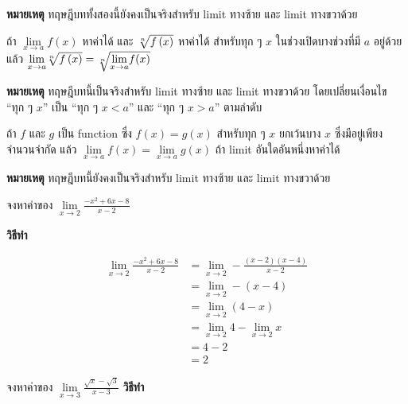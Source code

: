 \documentclass[
]{book}
\begin{document}
\textbf{หมายเหตุ} ทฤษฎีบททั้งสองนี้ยังคงเป็นจริงสำหรับ limit ทางซ้าย และ limit
ทางขวาด้วย

\label{thm-limit-3}
ถ้า \(\underset{x\rightarrow a}{\lim}f(x)\) หาค่าได้ และ
\(\root{n}\of{f\left( x\right) }\) หาค่าได้ สำหรับทุก ๆ \(x\)
ในช่วงเปิดบางช่วงที่มี \(a\) อยู่ด้วย แล้ว
\(\underset{x\rightarrow a}{\lim}\root{n}\of{f\left( x\right) }=\root{n}\of{\underset{x\rightarrow a}{\lim}f(x)}\)

\textbf{หมายเหตุ} ทฤษฎีบทนี้เป็นจริงสำหรับ limit ทางซ้าย และ limit ทางขวาด้วย
โดยเปลี่ยนเงื่อนไข ``ทุก ๆ \(x\)'' เป็น ``ทุก ๆ \(x < a\)'' และ ``ทุก ๆ
\(x > a\)'' ตามลำดับ

\label{thm-limit-4}
ถ้า \(f\) และ \(g\) เป็น function ซึ่ง
\(f\left( x\right) =g\left( x\right)\) สำหรับทุก ๆ \(x\) ยกเว้นบาง \(x\)
ซึ่งมีอยู่เพียงจำนวนจำกัด แล้ว
\(\underset{x\rightarrow a}{\lim}f(x)=\underset{x\rightarrow a}{\lim}g(x)\)
ถ้า limit อันใดอันหนึ่งหาค่าได้

\textbf{หมายเหตุ} ทฤษฎีบทนี้ยังคงเป็นจริงสำหรับ limit ทางซ้าย และ limit ทางขวาด้วย

\label{ex-limit-3}
จงหาค่าของ \(\underset{x\rightarrow 2}{\lim}\frac{-x^{2}+6x-8}{x-2}\)

\textbf{วิธีทำ}

\begin{equation}
  \begin{aligned}
    \lim_{x\rightarrow 2}\frac{-x^{2}+6x-8}{x-2}
    &= \lim_{x\rightarrow 2} -\frac{\left( x-2\right) \left( x-4\right) }{x-2}\\
    &= \lim_{x\rightarrow 2} -\left( x-4\right) \\ %
    &= \lim_{x\rightarrow 2}\left( 4-x\right) \\
    &= \lim_{x\rightarrow 2}4-\lim_{x\rightarrow 2}x\\
    &= 4-2 \\
    &= 2
  \end{aligned}
\end{equation}

\label{ex-limit-4}
จงหาค่าของ
\(\underset{x\rightarrow 3}{\lim}\frac{\sqrt{x}-\sqrt{3}}{x-3}\)
\textbf{วิธีทำ}
\end{document}
